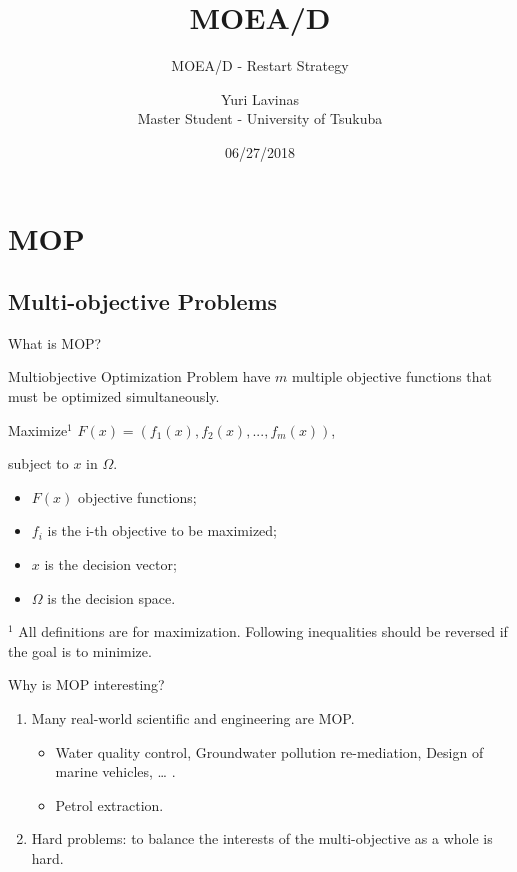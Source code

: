 \documentclass[ignorenonframetext,]{beamer}
\institute{System and Information Engineering}
\title{MOEA/D}
\subtitle{MOEA/D - Restart Strategy}
\author{Yuri Lavinas\\
Master Student - University of Tsukuba}
\date{06/27/2018}
\providecommand{\tightlist}{%
  \setlength{\itemsep}{0pt}\setlength{\parskip}{0pt}}
\begin{document}
\frame{\titlepage}

\section{MOP}\label{mop}

\subsection{Multi-objective Problems}\label{multi-objective-problems}

\begin{frame}{What is MOP?}

Multiobjective Optimization Problem have \(m\) multiple objective
functions that must be optimized simultaneously.

Maximize\(^1\) \(F(x) = (f_1(x), f_2(x), ..., f_m(x))\),

subject to \(x\) in \(\Omega\).

\begin{itemize}
\tightlist
\item
  \(F(x)\) objective functions;
\item
  \(f_i\) is the i-th objective to be maximized;
\item
  \(x\) is the decision vector;
\item
  \(\Omega\) is the decision space.
\end{itemize}

\footnotesize \(^1\) All definitions are for maximization. Following
inequalities should be reversed if the goal is to minimize.

\end{frame}

\begin{frame}{Why is MOP interesting?}

\begin{enumerate}
\def\labelenumi{\arabic{enumi}.}
\tightlist
\item
  Many real-world scientific and engineering are MOP.

  \begin{itemize}
  \tightlist
  \item
    Water quality control, Groundwater pollution re-mediation, Design of
    marine vehicles, \ldots{} \citet{coello2007evolutionary}.
  \item
    Petrol extraction.
  \end{itemize}
\item
  Hard problems: to balance the interests of the multi-objective as a
  whole is hard.
\end{enumerate}

\end{frame}
\end{document}
